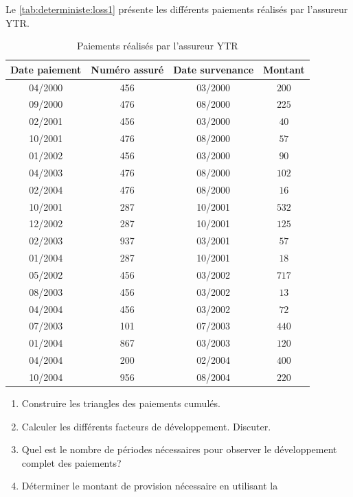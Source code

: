 \begin{exercice}
  Le \autoref{tab:deterministe:loss1} présente les différents
  paiements réalisés par l'assureur YTR.
  \begin{table}[!h]
    \centering
    \caption{Paiements réalisés par l'assureur YTR}
    \label{tab:deterministe:loss1}
    \begin{tabular}{cccc}
      \toprule
      Date paiement & Numéro assuré & Date survenance & Montant\\
      \midrule
      04/2000 & 456 & 03/2000 & $200$\\
      09/2000 & 476 & 08/2000 & $225$\\
      02/2001 & 456 & 03/2000 & $40$\\
      10/2001 & 476 & 08/2000 & $57$\\
      01/2002 & 456 & 03/2000 & $90$\\
      04/2003 & 476 & 08/2000 & $102$\\
      02/2004 & 476 & 08/2000 & $16$\\
      10/2001 & 287 & 10/2001 & $532$\\
      12/2002 & 287 & 10/2001 & $125$\\
      02/2003 & 937 & 03/2001 & $57$\\
      01/2004 & 287 & 10/2001 & $18$\\
      05/2002 & 456 & 03/2002 & $717$\\
      08/2003 & 456 & 03/2002 & $13$\\
      04/2004 & 456 & 03/2002 & $72$\\
      07/2003 & 101 & 07/2003 & $440$\\
      01/2004 & 867 & 03/2003 & $120$\\
      04/2004 & 200 & 02/2004 & $400$\\
      10/2004 & 956 & 08/2004 & $220$\\
      \bottomrule
    \end{tabular}
  \end{table}
  \begin{enumerate}
  \item Construire les triangles des paiements cumulés.
  \item Calculer les différents facteurs de développement. Discuter.
  \item Quel est le nombre de périodes nécessaires pour observer le
    développement complet des paiements?
  \item Déterminer le montant de provision nécessaire en utilisant la

\end{enumerate}
\end{exercice}
